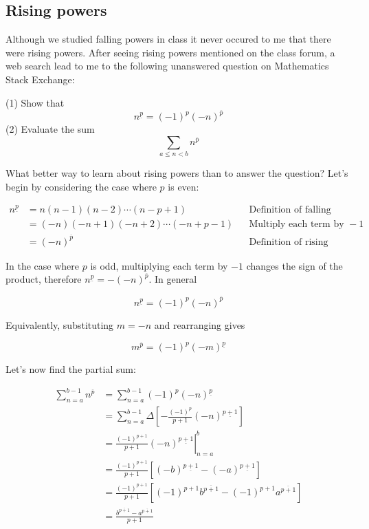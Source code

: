 \documentclass{article}
\begin{document}
\subsection*{Rising powers}

Although we studied falling powers in class it never occured to me that there
were rising powers. After seeing rising powers mentioned on the class forum, a
web search lead to me to the following unanswered question on Mathematics Stack
Exchange:

(1) Show that
$$
n^{\underline{p}}=(-1)^p(-n)^{\overline{p}}
$$
\indent (2) Evaluate the sum
$$
\sum\limits_{a\leq n < b} n^{\overline{p}}
$$

What better way to learn about rising powers than to answer the question?
Let's begin by considering the case where $p$ is even:

\begin{align*}
    n^{\underline{p}}&=n(n-1)(n-2)\cdots(n-p+1) && \text{Definition of falling powers}\\
&=(-n)(-n+1)(-n+2)\cdots(-n+p-1) && \text{Multiply each term by } -1\\
    &=(-n)^{\overline{p}}  && \text{Definition of rising powers}
\end{align*}

\noindent In the case where $p$ is odd, multiplying each term by $-1$ changes
the sign of the product, therefore $n^{\underline{p}}=-(-n)^{\overline{p}}$. In
general

$$
n^{\underline{p}}=(-1)^p(-n)^{\overline{p}}
$$

\noindent Equivalently, substituting $m=-n$ and rearranging gives

$$
m^{\overline{p}}=(-1)^p(-m)^{\underline{p}}
$$

Let's now find the partial sum:

\begin{align*}
\sum\limits_{n=a}^{b-1} n^{\overline{p}} &= \sum\limits_{n=a}^{b-1}(-1)^p(-n)^{\underline{p}} \\
&=\sum\limits_{n=a}^{b-1}\Delta\left[-\frac{(-1)^p}{p+1}(-n)^{\underline{p+1}}\right]\\
&=\left.\frac{(-1)^{p+1}}{p+1}(-n)^{\underline{p+1}}\right|_{n=a}^b \\
&= \frac{(-1)^{p+1}}{p+1}\left[(-b)^{\underline{p+1}}-(-a)^{\underline{p+1}}\right] \\
&= \frac{(-1)^{p+1}}{p+1}\left[(-1)^{p+1}b^{\overline{p+1}}-(-1)^{p+1}a^{\overline{p+1}}\right] \\
&= \frac{b^{\overline{p+1}}-a^{\overline{p+1}}}{p+1} \\
\end{align*}
\end{document}
